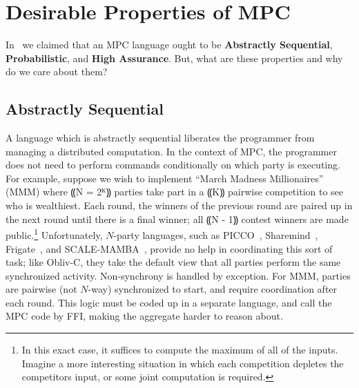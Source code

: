 \section{Desirable Properties of MPC}
\label{sec:background-properties}

In~ we claimed that an MPC language ought to be \textbf{Abstractly Sequential}, \textbf{Probabilistic},
and \textbf{High Assurance}. But, what are these properties and why do we care about them?

\subsection{Abstractly Sequential}
\label{subsec:background-properties-centralized}

A language which is abstractly sequential liberates the programmer from managing a distributed computation. In the context of MPC,
the programmer does not need to perform commands conditionally on which party is executing. For example, suppose we wish to implement
``March Madness Millionaires'' (MMM) where ⸨N = 2ᴷ⸩ parties take part in a ⸨K⸩ pairwise competition to see who is wealthiest. Each
round, the winners of the previous round are paired up in the next round until there is a final winner; all ⸨N - 1⸩ contest winners
are made public.\footnote{In this exact
  case, it suffices to compute the maximum of all of the inputs.
  Imagine a more interesting situation in which each competition
  depletes the competitors input, or some joint computation is
  required.}
Unfortunately, $N$-party languages, such as
PICCO~\cite{CCS:ZhaSteBla13},
Sharemind~\cite{ESORICS:BogLauWil08},
Frigate~\cite{Frigate},
and SCALE-MAMBA~\cite{SCALEMAMBA},
provide no help in coordinating this sort of task; like
Obliv-C, they take the default view that all parties perform
the same synchronized activity.
Non-synchrony is handled by exception.
For MMM, parties are pairwise (not $N$-way) synchronized to
start, and require coordination after each round.
This logic must be coded up in a separate language, and call the MPC
code by FFI, making the aggregate harder to
reason about.

\lstset{language=psl}

